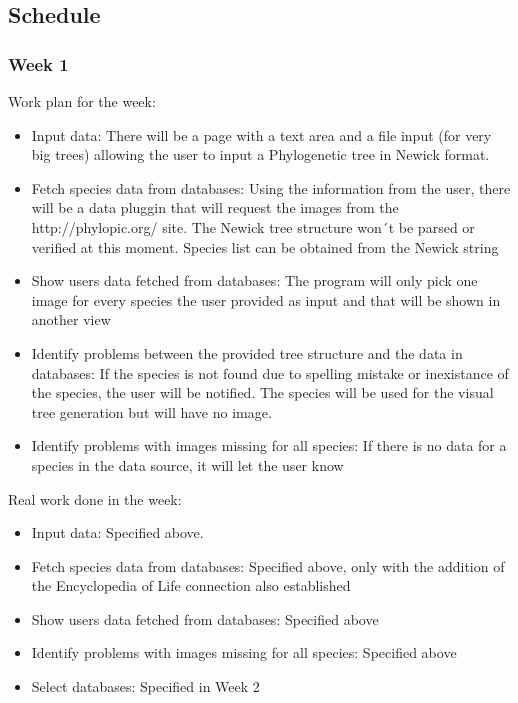 \documentclass[10pt]{article}
\begin{document}
 \subsection{Schedule}
  \subsubsection{Week 1}
  Work plan for the week:
   \begin{itemize}
    \item Input data: There will be a page with a text area and a file input (for very big trees) allowing the user to input a Phylogenetic tree in Newick format.
    \item Fetch species data from databases: Using the information from the user, there will be a data pluggin that will request the images from the http://phylopic.org/ site. The Newick tree structure won´t be parsed or verified at this moment. Species list can be obtained from the Newick string
   \item Show users data fetched from databases: The program will only pick one image for every species the user provided as input and that will be shown in another view
   \item Identify problems between the provided tree structure and the data in databases: If the species is not found due to spelling mistake or inexistance of the species, the user will be notified. The species will be used for the visual tree generation but will have no image.
   \item Identify problems with images missing for all species: If there is no data for a species in the data source, it will let the user know
   \end{itemize}
   Real work done in the week:
   \begin{itemize}
	   \item Input data: Specified above.
	   \item Fetch species data from databases: Specified above, only with the addition of the Encyclopedia of Life connection also established
	   \item Show users data fetched from databases: Specified above
	   \item Identify problems with images missing for all species: Specified above
	   \item Select databases: Specified in Week 2
   \end{itemize}
\end{document}

